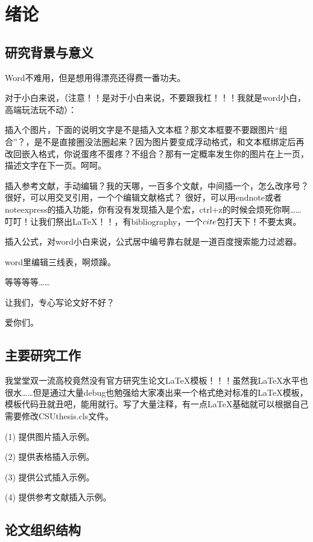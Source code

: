 \section{绪论}
\subsection{研究背景与意义}

Word不难用，但是想用得漂亮还得费一番功夫。

对于小白来说，（注意！！是对于小白来说，不要跟我杠！！！我就是word小白，高端玩法玩不动）：

插入个图片，下面的说明文字是不是插入文本框？那文本框要不要跟图片“组合”？，是不是直接圈没法圈起来？因为图片要变成浮动格式，和文本框绑定后再改回嵌入格式，你说蛋疼不蛋疼？不组合？那有一定概率发生你的图片在上一页，描述文字在下一页。呵呵。

插入参考文献，手动编辑？我的天哪，一百多个文献，中间插一个，怎么改序号？ 
很好，可以用交叉引用，一个个编辑文献格式？
很好，可以用endnote或者noteexpress的插入功能，你有没有发现插入是个宏，ctrl+z的时候会烦死你啊……
叮叮！让我们祭出LaTeX！！，有bibliography，一个$\\cite$包打天下！不要太爽。

插入公式，对word小白来说，公式居中编号靠右就是一道百度搜索能力过滤器。

word里编辑三线表，啊烦躁。

等等等等……

让我们，专心写论文好不好？

爱你们。


\subsection{主要研究工作}
我堂堂双一流高校竟然没有官方研究生论文LaTeX模板！！！虽然我LaTeX水平也很水……但是通过大量debug也勉强给大家凑出来一个格式绝对标准的LaTeX模板，模板代码丑就丑吧，能用就行。写了大量注释，有一点LaTeX基础就可以根据自己需要修改CSUthesis.cls文件。

(1) 提供图片插入示例。

(2) 提供表格插入示例。

(3) 提供公式插入示例。

(4) 提供参考文献插入示例。

\subsection{论文组织结构}

